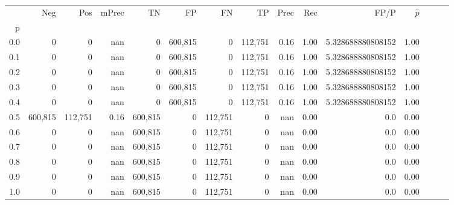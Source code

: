 \begin{tabular}{rrrrrrrrrrrrrrr}
\toprule
{} &      Neg &      Pos & mPrec &       TN &       FP &       FN &       TP &  Prec &   Rec &               FP/P & $\hat{p}$ \\
p   &          &          &       &          &          &          &          &       &       &                    &           \\
\midrule
0.0 &        0 &        0 &   nan &        0 &  600,815 &        0 &  112,751 &  0.16 &  1.00 &  5.328688880808152 &      1.00 \\
0.1 &        0 &        0 &   nan &        0 &  600,815 &        0 &  112,751 &  0.16 &  1.00 &  5.328688880808152 &      1.00 \\
0.2 &        0 &        0 &   nan &        0 &  600,815 &        0 &  112,751 &  0.16 &  1.00 &  5.328688880808152 &      1.00 \\
0.3 &        0 &        0 &   nan &        0 &  600,815 &        0 &  112,751 &  0.16 &  1.00 &  5.328688880808152 &      1.00 \\
0.4 &        0 &        0 &   nan &        0 &  600,815 &        0 &  112,751 &  0.16 &  1.00 &  5.328688880808152 &      1.00 \\
0.5 &  600,815 &  112,751 &  0.16 &  600,815 &        0 &  112,751 &        0 &   nan &  0.00 &                0.0 &      0.00 \\
0.6 &        0 &        0 &   nan &  600,815 &        0 &  112,751 &        0 &   nan &  0.00 &                0.0 &      0.00 \\
0.7 &        0 &        0 &   nan &  600,815 &        0 &  112,751 &        0 &   nan &  0.00 &                0.0 &      0.00 \\
0.8 &        0 &        0 &   nan &  600,815 &        0 &  112,751 &        0 &   nan &  0.00 &                0.0 &      0.00 \\
0.9 &        0 &        0 &   nan &  600,815 &        0 &  112,751 &        0 &   nan &  0.00 &                0.0 &      0.00 \\
1.0 &        0 &        0 &   nan &  600,815 &        0 &  112,751 &        0 &   nan &  0.00 &                0.0 &      0.00 \\
\bottomrule
\end{tabular}
